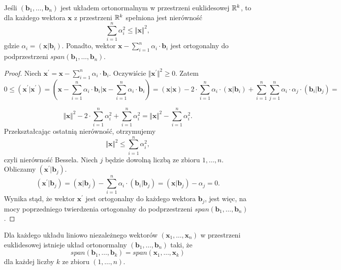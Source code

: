 \documentclass[12pt,a4paper]{report}
\newcommand{\vr}[1]{\mathbf{#1}}
\begin{document}
\begin{theorem} \label{Nierówność-Bessela}
Jeśli $(\vr{b}_{1}, \ldots, \vr{b}_{n})$ jest układem ortonormalnym w przestrzeni euklidesowej $\mathbb{R}^k$, to dla każdego wektora $\vr{x}$ z przestrzeni $\mathbb{R}^k$ spełniona jest nierówność 
$$
\sum_{i=1}^{n}\alpha_{i}^{2}\leq \Vert\vr{x}\Vert^{2},
$$
gdzie $\alpha_{i} = (\vr{x}|\vr{b}_{i})$. Ponadto, wektor $\vr{x} - \sum_{i=1}^{n} \alpha_{i} \cdot \vr{b}_{i}$ jest ortogonalny do podprzestrzeni $span(\vr{b}_{1}, \ldots, \vr{b}_{n})$.

\begin{proof}
Niech $\vr{x}^{'} = \vr{x} -\sum_{i=1}^{n} \alpha_{i} \cdot \vr{b}_{i}$. Oczywiście $\Vert \vr{x}^{'} \Vert^{2} \geq 0$. Zatem
$$
0\leq (\vr{x}^{'}|\vr{x}^{'}) = (\vr{x} - \sum_{i=1}^{n} \alpha_{i} \cdot \vr{b}_{i} | \vr{x} - \sum_{i=1}^{n} \alpha_{i} \cdot \vr{b}_{i}) = (\vr{x}|\vr{x}) - 2\cdot \sum_{i=1}^{n} \alpha_{i}\cdot(\vr{x}|\vr{b}_{i}) + \sum_{i=1}^{n}\sum_{j=1}^{n} \alpha_{i}\cdot\alpha_{j}\cdot(\vr{b}_{i}|\vr{b}_{j}) =
$$

$$
\Vert\vr{x}\Vert^{2} - 2\cdot\sum_{i=1}^{n}\alpha_{i}^{2} + \sum_{i=1}^{n}\alpha_{i}^{2} = \Vert \vr{x} \Vert^{2} - \sum_{i=1}^{n}\alpha_{i}^{2}.
$$
Przekształcając ostatnią nierówność, otrzymujemy
$$
\Vert\vr{x}\Vert^{2} \leq \sum_{i=1}^{n}\alpha_{i}^{2},
$$
czyli nierówność Bessela.
Niech $j$ będzie dowolną liczbą ze zbioru ${1, \ldots, n}$. Obliczamy $(\vr{x}^{'}|\vr{b}_{j})$.
$$
(\vr{x}^{'}|\vr{b}_{j}) = (\vr{x}|\vr{b}_{j}) - \sum_{i=1}^{n}\alpha_{i}\cdot(\vr{b}_{i}|\vr{b}_{j}) = (\vr{x}|\vr{b}_{j}) - \alpha_{j} = 0.
$$
Wynika stąd, że wektor $\vr{x}^{'}$ jest ortogonalny do każdego wektora $\vr{b}_{j}$, jest więc, na mocy poprzedniego twierdzenia ortogonalny do podprzestrzeni $span(\vr{b}_{1}, \ldots, \vr{b}_{n})$.
\end{proof}

\end{theorem}

\begin{theorem} \label{theorem-gram-schmidt}
Dla każdego układu liniowo niezależnego wektorów $(\vr{x}_{1},\ldots,\vr{x}_{n})$ w przestrzeni euklidesowej istnieje układ ortonormalny $(\vr{b}_{1},\ldots, \vr{b}_{n})$ taki, że 
$$
span(\vr{b}_{1},\ldots, \vr{b}_{k}) = span(\vr{x}_{1},\ldots, \vr{x}_{k})
$$
dla każdej liczby $k$ ze zbioru $(1,\ldots,n)$.
\end{theorem}
\end{document}
